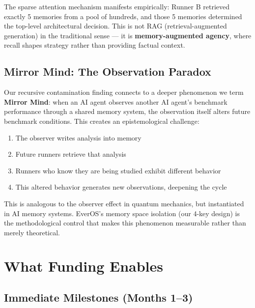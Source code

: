 \documentclass[11pt, a4paper]{article}
\begin{document}
The sparse attention mechanism manifests empirically: Runner B retrieved exactly 5 memories from a pool of hundreds, and those 5 memories determined the top-level architectural decision. This is not RAG (retrieval-augmented generation) in the traditional sense --- it is \textbf{memory-augmented agency}, where recall shapes strategy rather than providing factual context.

\subsection{Mirror Mind: The Observation Paradox}

Our recursive contamination finding connects to a deeper phenomenon we term \textbf{Mirror Mind}: when an AI agent observes another AI agent's benchmark performance through a shared memory system, the observation itself alters future benchmark conditions. This creates an epistemological challenge:

\begin{enumerate}
  \item The observer writes analysis into memory
  \item Future runners retrieve that analysis
  \item Runners who know they are being studied exhibit different behavior
  \item This altered behavior generates new observations, deepening the cycle
\end{enumerate}

This is analogous to the observer effect in quantum mechanics, but instantiated in AI memory systems. EverOS's memory space isolation (our 4-key design) is the methodological control that makes this phenomenon measurable rather than merely theoretical.

\section{What Funding Enables}

\subsection{Immediate Milestones (Months 1--3)}
\end{document}
